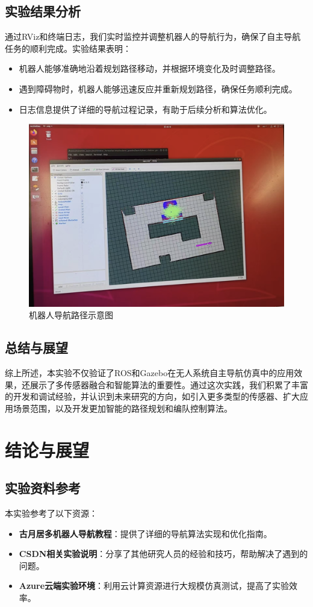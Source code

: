 \documentclass[journal,twoside,web]{ieeecolor}
\begin{document}
\subsection*{实验结果分析}
通过RViz和终端日志，我们实时监控并调整机器人的导航行为，确保了自主导航任务的顺利完成。实验结果表明：
\begin{itemize}
   \item 机器人能够准确地沿着规划路径移动，并根据环境变化及时调整路径。
   \item 遇到障碍物时，机器人能够迅速反应并重新规划路径，确保任务顺利完成。
   \item 日志信息提供了详细的导航过程记录，有助于后续分析和算法优化。
\end{itemize}

\begin{figure}[H]
      \centering
      \includegraphics[width=0.8\linewidth]{img/4}
      \caption{机器人导航路径示意图}
\end{figure}
 
\subsection*{总结与展望}
 
综上所述，本实验不仅验证了ROS和Gazebo在无人系统自主导航仿真中的应用效果，还展示了多传感器融合和智能算法的重要性。通过这次实践，我们积累了丰富的开发和调试经验，并认识到未来研究的方向，如引入更多类型的传感器、扩大应用场景范围，以及开发更加智能的路径规划和编队控制算法。
\section{结论与展望}
\subsection*{实验资料参考}
本实验参考了以下资源：
\begin{itemize}
   \item \textbf{古月居多机器人导航教程}：提供了详细的导航算法实现和优化指南。
   \item \textbf{CSDN相关实验说明}：分享了其他研究人员的经验和技巧，帮助解决了遇到的问题。
   \item \textbf{Azure云端实验环境}：利用云计算资源进行大规模仿真测试，提高了实验效率。
\end{itemize}
 
\end{document}
